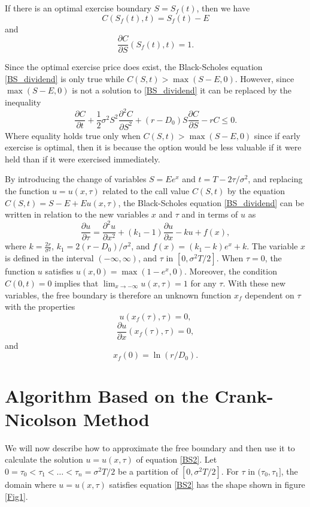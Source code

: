 \documentclass[00main.tex]{subfiles}
\begin{document}
If there is an optimal exercise boundary $S = S_f (t)$, then we have \[ C(S_f (t), t) = S_f (t) -E \] and \[ \frac{\partial C}{\partial S} (S_f (t),t) = 1. \]

Since the optimal exercise price does exist, the Black-Scholes equation \ref{BS_dividend} is only true while $C(S,t) > \max (S-E,0)$. However, since $\max (S-E,0)$ is not a solution to \ref{BS_dividend} it can be replaced by the inequality \[ \frac{\partial C}{\partial t} + \frac{1}{2} \sigma^2 S^2 \frac{\partial^2 C}{\partial S^2} + (r-D_0) S \frac{\partial C}{\partial S} - rC \leq 0. \] Where equality holds true only when $C(S,t) > \max (S-E,0)$ since if early exercise is optimal, then it is because the option would be less valuable if it were held than if it were exercised immediately.


By introducing the change of variables $S=Ee^x$ and $t=T- 2\tau/\sigma^2$, and replacing the function $u=u(x,\tau)$ related to the call value $C(S,t)$ by  the equation $C(S,t)= S-E+Eu(x,\tau)$, the Black-Scholes equation \ref{BS_dividend} can be written in relation to the new variables $x$ and $\tau$ and in terms of $u$ as 
\begin{equation}
\frac{\partial{u}}{\partial \tau} = \frac{\partial^2{u}}{\partial x^2} + (k_1-1)\frac{\partial{u}}{\partial x} - ku  +f(x),
\label{BS2}
\end{equation}
where $\displaystyle k=\frac{2r}{\sigma^2}$,  $k_1 =2(r-D_0)/\sigma^2$, and $f(x)=(k_1-k)e^x+k$. The variable $x$ is defined in the interval $(-\infty,\infty)$, and $\tau$ in $[0, \sigma^2 T/2]$. When $\tau=0$, the function $u$ satisfies $u(x,0)=\max(1-e^x,0)$. Moreover, the condition $C(0,t)=0 $  implies that $\lim_{x\rightarrow -\infty} u(x,\tau)=1$ for any $\tau$. 
With these new variables, the free boundary is therefore an unknown function $x_f$ dependent on $\tau$ with the properties
\[ u(x_f(\tau), \tau)=0,\] \[ \frac{\partial u}{\partial x}(x_f(\tau),\tau)=0,\] and \[x_f(0)=\ln(r/D_0).\]



 
\section{Algorithm Based on the Crank-Nicolson Method}


We will now describe how to approximate the free boundary and then use it to calculate the solution $u = u(x,\tau)$ of equation \eqref{BS2}.  Let $0=\tau_0<\tau_1<\hdots <\tau_n =\sigma^2 T/2$ be a partition of $[0,\sigma^2 T/2]$. For $\tau$ in $(\tau_0,\tau_1]$, the domain where $u=u(x,\tau)$ satisfies equation \eqref{BS2} has the shape shown in figure \ref{Fig1}. 
\end{document}

